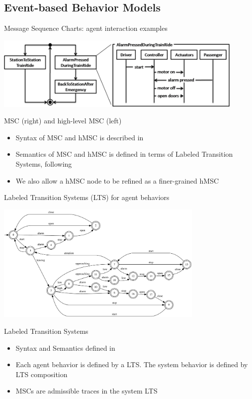 \documentclass[11pt]{beamer}
\begin{document}
\subsection{Event-based Behavior Models}
\begin{frame}{Message Sequence Charts:  agent interaction examples}
	\begin{center}
		\includegraphics[width=12cm]{images/Train_hMSC_MSC.png}
	\end{center}
	\begin{block}{MSC (right) and high-level MSC (left)}
		\begin{itemize}
			\item Syntax of MSC and hMSC is described in \cite{ITU96}
			\item Semantics of MSC and hMSC is defined in terms of Labeled Transition Systems, following \cite{Uchitel03}
			\item We also allow a hMSC node to be refined as a finer-grained hMSC
		\end{itemize}
	\end{block}
\end{frame}

\begin{frame}{Labeled Transition Systems (LTS) for agent behaviors}
	\vspace{-0.5cm}
	\begin{center}
		\includegraphics[width=10cm]{images/bigtrain.pdf}
	\end{center}
	\vspace{-1.5cm}
	\begin{block}{Labeled Transition Systems}
		\begin{itemize}
			\item Syntax and Semantics defined in \cite{Magee99}
			\item Each agent behavior is defined by a LTS. The system behavior is defined by LTS composition \cite{Magee99}
			\item MSCs are admissible traces in the system LTS \cite{Uchitel03}
		\end{itemize}
	\end{block}
\end{frame}
\end{document}
